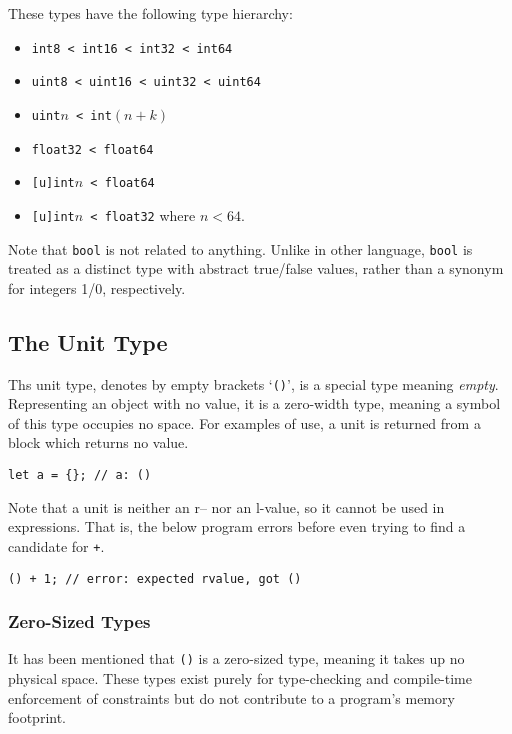 These types have the following type hierarchy:
\begin{itemize}
    \item \texttt{int8 < int16 < int32 < int64}
    \item \texttt{uint8 < uint16 < uint32 < uint64}
    \item \texttt{uint\(n\) < int\((n+k)\)}
    \item \texttt{float32 < float64}
    \item \texttt{[u]int\(n\) < float64}
    \item \texttt{[u]int\(n\) < float32} where \(n < 64\).
\end{itemize}

Note that \texttt{bool} is not related to anything.
Unlike in other language, \texttt{bool} is treated as a distinct type with abstract true/false values, rather than a synonym for integers 1/0, respectively.

\subsection{The Unit Type}

Ths unit type, denotes by empty brackets `\texttt{()}', is a special type meaning \textit{empty}.
Representing an object with no value, it is a zero-width type, meaning a symbol of this type occupies no space.
For examples of use, a unit is returned from a block which returns no value.

\begin{lstlisting}[language=CustomLang]
let a = {}; // a: ()
\end{lstlisting}

Note that a unit is neither an r-- nor an l-value, so it cannot be used in expressions.
That is, the below program errors before even trying to find a candidate for \texttt{+}.

\begin{lstlisting}[language=CustomLang]
() + 1; // error: expected rvalue, got ()
\end{lstlisting}

\subsubsection{Zero-Sized Types}

It has been mentioned that \texttt{()} is a zero-sized type, meaning it takes up no physical space.
These types exist purely for type-checking and compile-time enforcement of constraints but do not contribute to a program's memory footprint.

